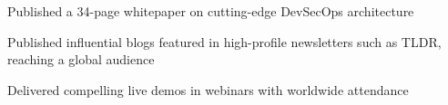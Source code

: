 \item Published a 34-page whitepaper on cutting-edge DevSecOps architecture
\item Published influential blogs featured in high-profile newsletters such as TLDR, reaching a global audience
\item Delivered compelling live demos in webinars with worldwide attendance